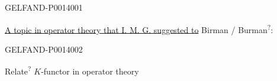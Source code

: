 \begin{GelfandAdjacentEvidence}{GELFAND-P001400}{1}

\uline{A topic in operator theory that I. M. G. suggested to}
Birman / Burman\textsuperscript{?}:

\end{GelfandAdjacentEvidence}
\begin{GelfandAdjacentEvidence}{GELFAND-P001400}{2}



Relate\textsuperscript{?}
\(K\)-functor in operator theory

\end{GelfandAdjacentEvidence}
